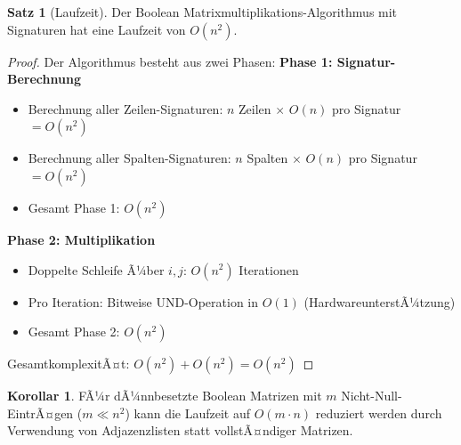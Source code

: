 ﻿\documentclass[a4paper,12pt]{article}
\theoremstyle{definition}
\newtheorem{satz}{Satz}
\newtheorem{korollar}{Korollar}
\begin{document}
\begin{satz}[Laufzeit]
	Der Boolean Matrixmultiplikations-Algorithmus mit Signaturen hat eine Laufzeit von $O(n^2)$.
\end{satz}

\begin{proof}
	Der Algorithmus besteht aus zwei Phasen:\newline	
	\textbf{Phase 1: Signatur-Berechnung}
	\begin{itemize}
		\item[-] Berechnung aller Zeilen-Signaturen: $n$ Zeilen $\times$ $O(n)$ pro Signatur $= O(n^2)$
		\item[-] Berechnung aller Spalten-Signaturen: $n$ Spalten $\times$ $O(n)$ pro Signatur $= O(n^2)$
		\item[-] Gesamt Phase 1: $O(n^2)$
	\end{itemize}
	\textbf{Phase 2: Multiplikation}
	\begin{itemize}
		\item[-] Doppelte Schleife Ã¼ber $i, j$: $O(n^2)$ Iterationen
		\item[-] Pro Iteration: Bitweise UND-Operation in $O(1)$ (HardwareunterstÃ¼tzung)
		\item[-] Gesamt Phase 2: $O(n^2)$
	\end{itemize}
	
	GesamtkomplexitÃ¤t: $O(n^2) + O(n^2) = O(n^2)$
\end{proof}

\begin{korollar}
	FÃ¼r dÃ¼nnbesetzte Boolean Matrizen mit $m$ Nicht-Null-EintrÃ¤gen ($m \ll n^2$) kann die Laufzeit auf $O(m \cdot n)$ reduziert werden durch Verwendung von Adjazenzlisten statt vollstÃ¤ndiger Matrizen.
\end{korollar}
\end{document}
